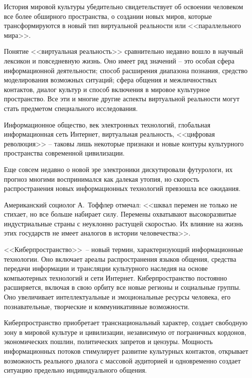   История мировой культуры убедительно свидетельствует об освоении человеком
  все более обширного пространства, о создании новых миров, которые
  трансформируются в новый тип виртуальной реальности или <<параллельного
  мира>>.
    
  Понятие <<виртуальная реальность>> сравнительно недавно вошло в научный
  лексикон и повседневную жизнь. Оно имеет ряд значений – это особая сфера
  информационной деятельности; способ расширения диапазона познания, средство
  моделирования возможных ситуаций; сфера общения и межличностных контактов,
  диалог культур и способ включения в мировое культурное пространство. Все эти
  и многие другие аспекты виртуальной реальности могут стать предметом
  специального исследования.
  
  Информационное общество, век электронных технологий, глобальная
  информационная сеть Интернет, виртуальная реальность, <<цифровая революция>>
  – таковы лишь некоторые признаки и новые контуры культурного пространства
  современной цивилизации.
  
  Еще совсем недавно о новой эре электроники дискутировали футурологи, их
  прогноз многими воспринимался как далекая утопия, но скорость распространения
  новых информационных технологий превзошла все ожидания.
  
  Американский социолог А.~Тоффлер отмечал: <<шквал перемен не только не
  стихает, но все больше набирает силу. Перемены охватывают высокоразвитые
  индустриальные страны с неуклонно растущей скоростью. Их влияние на жизнь
  этих государств не имеет аналогов в истории человечества>>.
  
  <<Киберпространство>>~-- новый термин, характеризующий информационные
  технологии. Оно включает ареалы распространения языков общения, средства
  передачи информации и трансляции культурного наследия на основе компьютерных
  технологий и сети Интернет. Киберпространство постоянно расширяется, включая
  в свою орбиту все новые регионы и социальные группы. Оно увеличивает
  интеллектуальные и эмоциональные ресурсы человека, его познавательные,
  творческие и коммуникативные возможности.
  
  Киберпространство приобретает транснациональный характер, создает свободную
  зону в мировой культуре и цивилизации, независимую от пограничных кордонов,
  экономических пошлин, политических запретов и цензуры. Мощность
  информационных потоков стимулирует развитие культурных контактов, открывает
  возможность реального диалога с массовой аудиторией и одновременно создает
  ситуацию предельно индивидуального общения.
  
